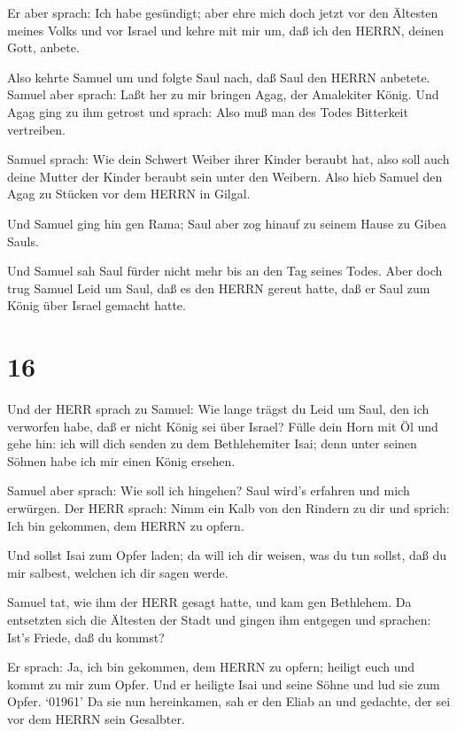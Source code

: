  Er aber sprach: Ich habe gesündigt; aber ehre mich doch
jetzt vor den Ältesten meines Volks und vor Israel und kehre mit mir um,
daß ich den HERRN, deinen Gott, anbete.

 Also kehrte Samuel um und folgte Saul nach, daß Saul den
HERRN anbetete.  Samuel aber sprach: Laßt her zu mir
bringen Agag, der Amalekiter König. Und Agag ging zu ihm getrost und
sprach: Also muß man des Todes Bitterkeit vertreiben.

 Samuel sprach: Wie dein Schwert Weiber ihrer Kinder
beraubt hat, also soll auch deine Mutter der Kinder beraubt sein unter
den Weibern. Also hieb Samuel den Agag zu Stücken vor dem HERRN in
Gilgal.

 Und Samuel ging hin gen Rama; Saul aber zog hinauf zu
seinem Hause zu Gibea Sauls.

 Und Samuel sah Saul fürder nicht mehr bis an den Tag
seines Todes. Aber doch trug Samuel Leid um Saul, daß es den HERRN
gereut hatte, daß er Saul zum König über Israel gemacht hatte.

\hypertarget{section-15}{%
\section{16}\label{section-15}}

 Und der HERR sprach zu Samuel: Wie lange trägst du Leid um
Saul, den ich verworfen habe, daß er nicht König sei über Israel? Fülle
dein Horn mit Öl und gehe hin: ich will dich senden zu dem Bethlehemiter
Isai; denn unter seinen Söhnen habe ich mir einen König ersehen.

 Samuel aber sprach: Wie soll ich hingehen? Saul wird's
erfahren und mich erwürgen. Der HERR sprach: Nimm ein Kalb von den
Rindern zu dir und sprich: Ich bin gekommen, dem HERRN zu opfern.

 Und sollst Isai zum Opfer laden; da will ich dir weisen,
was du tun sollst, daß du mir salbest, welchen ich dir sagen werde.

 Samuel tat, wie ihm der HERR gesagt hatte, und kam gen
Bethlehem. Da entsetzten sich die Ältesten der Stadt und gingen ihm
entgegen und sprachen: Ist's Friede, daß du kommst?

 Er sprach: Ja, ich bin gekommen, dem HERRN zu opfern;
heiligt euch und kommt zu mir zum Opfer. Und er heiligte Isai und seine
Söhne und lud sie zum Opfer.  `01961' Da sie nun
hereinkamen, sah er den Eliab an und gedachte, der sei vor dem HERRN
sein Gesalbter.

